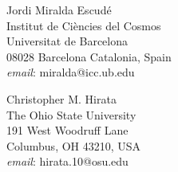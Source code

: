 \documentclass{article}
\newlength{\cvindent}
\newenvironment{cvlist}{%
  \begin{list}{}{%
    \setlength{\leftmargin}{\cvindent}%
    \setlength{\rightmargin}{0pt}%
    \setlength{\topsep}{0pt}%
    \setlength{\partopsep}{0pt}%
    \setlength{\parsep}{0pt}%
    \setlength{\itemsep}{0pt}%
  }%
  \item\relax
}{%
  \end{list}
}
\begin{document}
\begin{cvlist}
		\vspace{0.8em}

		\noindent\begin{minipage}[t]{0.48\textwidth}
			 	Jordi Miralda Escud\'{e} \\
				Institut de Ciències del Cosmos \\
				Universitat de Barcelona \\
				08028 Barcelona
				Catalonia, Spain \\
				\textit{email}: miralda@icc.ub.edu \\
		\end{minipage}\hfill
		\noindent\begin{minipage}[t]{0.48\textwidth} 
				Christopher M. Hirata \\
			 	The Ohio State University \\
			 	191 West Woodruff Lane \\
			 		Columbus, OH 43210, USA \\
			 		\textit{email}: hirata.10@osu.edu \\
		\end{minipage}
\end{cvlist}
\end{document}
